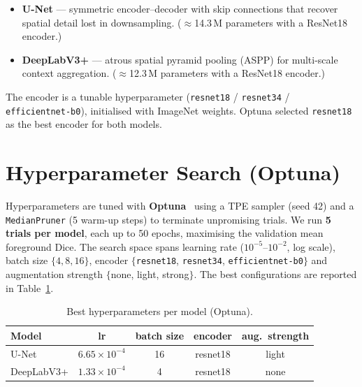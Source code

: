 \documentclass[11pt,a4paper]{article}
\begin{document}
\begin{itemize}
  \item \textbf{U-Net} --- symmetric encoder--decoder with skip connections that recover
        spatial detail lost in downsampling. ($\approx$14.3\,M parameters with a ResNet18
        encoder.)
  \item \textbf{DeepLabV3+} --- atrous spatial pyramid pooling (ASPP) for multi-scale
        context aggregation. ($\approx$12.3\,M parameters with a ResNet18 encoder.)
\end{itemize}

The encoder is a tunable hyperparameter
(\texttt{resnet18} / \texttt{resnet34} / \texttt{efficientnet-b0}), initialised with
ImageNet weights. Optuna selected \texttt{resnet18} as the best encoder for both models.

\section{Hyperparameter Search (Optuna)}
Hyperparameters are tuned with \textbf{Optuna}~\cite{optuna} using a TPE sampler
(seed 42) and a \texttt{MedianPruner} (5 warm-up steps) to terminate unpromising trials.
We run \textbf{5 trials per model}, each up to 50 epochs, maximising the validation mean
foreground Dice. The search space spans learning rate ($10^{-5}$--$10^{-2}$, log scale),
batch size $\{4,8,16\}$, encoder
$\{$\texttt{resnet18}, \texttt{resnet34}, \texttt{efficientnet-b0}$\}$ and augmentation
strength $\{$none, light, strong$\}$. The best configurations are reported in
Table~\ref{tab:best}.

\begin{table}[H]
\centering
\caption{Best hyperparameters per model (Optuna).}
\label{tab:best}
\begin{tabular}{lcccc}
\toprule
Model & lr & batch size & encoder & aug.\ strength \\
\midrule
U-Net      & $6.65\times10^{-4}$ & 16 & resnet18 & light \\
DeepLabV3+ & $1.33\times10^{-4}$ & 4  & resnet18 & none  \\
\bottomrule
\end{tabular}
\end{table}
\end{document}
